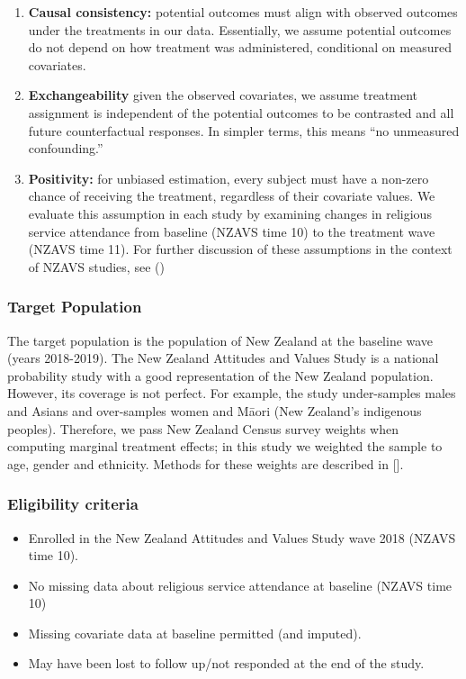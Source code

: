 \documentclass[
  single column]{article}
\providecommand{\tightlist}{%
  \setlength{\itemsep}{0pt}\setlength{\parskip}{0pt}}\usepackage{longtable,booktabs,array}
\begin{document}
\begin{enumerate}
\def\labelenumi{\arabic{enumi}.}
\item
  \textbf{Causal consistency:} potential outcomes must align with
  observed outcomes under the treatments in our data. Essentially, we
  assume potential outcomes do not depend on how treatment was
  administered, conditional on measured covariates.
\item
  \textbf{Exchangeability} given the observed covariates, we assume
  treatment assignment is independent of the potential outcomes to be
  contrasted and all future counterfactual responses. In simpler terms,
  this means ``no unmeasured confounding.''
\item
  \textbf{Positivity:} for unbiased estimation, every subject must have
  a non-zero chance of receiving the treatment, regardless of their
  covariate values. We evaluate this assumption in each study by
  examining changes in religious service attendance from baseline (NZAVS
  time 10) to the treatment wave (NZAVS time 11). For further discussion
  of these assumptions in the context of NZAVS studies, see
  ()
\end{enumerate}

\subsubsection{Target Population}\label{target-population}

The target population is the population of New Zealand at the baseline
wave (years 2018-2019). The New Zealand Attitudes and Values Study is a
national probability study with a good representation of the New Zealand
population. However, its coverage is not perfect. For example, the study
under-samples males and Asians and over-samples women and Māori (New
Zealand's indigenous peoples). Therefore, we pass New Zealand Census
survey weights when computing marginal treatment effects; in this study
we weighted the sample to age, gender and ethnicity. Methods for these
weights are described in {[}{]}.

\subsubsection{Eligibility criteria}\label{eligibility-criteria}

\begin{itemize}
\tightlist
\item
  Enrolled in the New Zealand Attitudes and Values Study wave 2018
  (NZAVS time 10).
\item
  No missing data about religious service attendance at baseline (NZAVS
  time 10)
\item
  Missing covariate data at baseline permitted (and imputed).
\item
  May have been lost to follow up/not responded at the end of the study.
\end{itemize}
\end{document}
